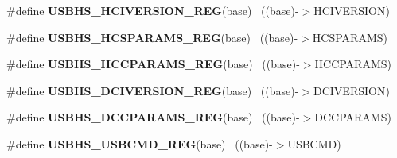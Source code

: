 \begin{DoxyCompactItemize}
\item 
\hypertarget{group___u_s_b_h_s___register___accessor___macros_gab84efe599869511e6dc9050926fcc289}{}\#define {\bfseries U\+S\+B\+H\+S\+\_\+\+H\+C\+I\+V\+E\+R\+S\+I\+O\+N\+\_\+\+R\+E\+G}(base)                          ~((base)-\/$>$H\+C\+I\+V\+E\+R\+S\+I\+O\+N)\label{group___u_s_b_h_s___register___accessor___macros_gab84efe599869511e6dc9050926fcc289}

\item 
\hypertarget{group___u_s_b_h_s___register___accessor___macros_ga3ea93afd70eeae89d36215c4693a5a65}{}\#define {\bfseries U\+S\+B\+H\+S\+\_\+\+H\+C\+S\+P\+A\+R\+A\+M\+S\+\_\+\+R\+E\+G}(base)                            ~((base)-\/$>$H\+C\+S\+P\+A\+R\+A\+M\+S)\label{group___u_s_b_h_s___register___accessor___macros_ga3ea93afd70eeae89d36215c4693a5a65}

\item 
\hypertarget{group___u_s_b_h_s___register___accessor___macros_ga713cb4071c3199e4d7e8cdff4076e5f8}{}\#define {\bfseries U\+S\+B\+H\+S\+\_\+\+H\+C\+C\+P\+A\+R\+A\+M\+S\+\_\+\+R\+E\+G}(base)                            ~((base)-\/$>$H\+C\+C\+P\+A\+R\+A\+M\+S)\label{group___u_s_b_h_s___register___accessor___macros_ga713cb4071c3199e4d7e8cdff4076e5f8}

\item 
\hypertarget{group___u_s_b_h_s___register___accessor___macros_gaa08896261dc1d8f130591b8eb496570a}{}\#define {\bfseries U\+S\+B\+H\+S\+\_\+\+D\+C\+I\+V\+E\+R\+S\+I\+O\+N\+\_\+\+R\+E\+G}(base)                          ~((base)-\/$>$D\+C\+I\+V\+E\+R\+S\+I\+O\+N)\label{group___u_s_b_h_s___register___accessor___macros_gaa08896261dc1d8f130591b8eb496570a}

\item 
\hypertarget{group___u_s_b_h_s___register___accessor___macros_ga964cc695222af371ea1a94e5cdc6e71f}{}\#define {\bfseries U\+S\+B\+H\+S\+\_\+\+D\+C\+C\+P\+A\+R\+A\+M\+S\+\_\+\+R\+E\+G}(base)                            ~((base)-\/$>$D\+C\+C\+P\+A\+R\+A\+M\+S)\label{group___u_s_b_h_s___register___accessor___macros_ga964cc695222af371ea1a94e5cdc6e71f}

\item 
\hypertarget{group___u_s_b_h_s___register___accessor___macros_gac6660d1b32922e352e39bc2b71ee48b6}{}\#define {\bfseries U\+S\+B\+H\+S\+\_\+\+U\+S\+B\+C\+M\+D\+\_\+\+R\+E\+G}(base)                                  ~((base)-\/$>$U\+S\+B\+C\+M\+D)\label{group___u_s_b_h_s___register___accessor___macros_gac6660d1b32922e352e39bc2b71ee48b6}


\end{DoxyCompactItemize}
